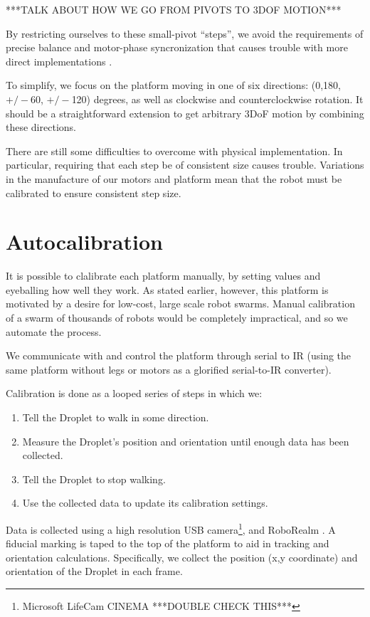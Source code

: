 \documentclass[letterpaper, 10pt, conference]{ieeeconf}
\begin{document}
***TALK ABOUT HOW WE GO FROM PIVOTS TO 3DOF MOTION***

By restricting ourselves to these small-pivot ``steps'', we avoid the requirements of precise balance and motor-phase syncronization that causes trouble with more direct implementations \cite{Vartholomeos2006}.

To simplify, we focus on the platform moving in one of six directions: (0,180, $+/-$60, $+/-$120) degrees, as well as clockwise and counterclockwise rotation. It should be a straightforward extension to get arbitrary 3DoF motion by combining these directions.

 There are still some difficulties to overcome with physical implementation. In particular, requiring that each step be of consistent size causes trouble. Variations in the manufacture of our motors and platform mean that the robot must be calibrated to ensure consistent step size.

\section{Autocalibration}

It is possible to clalibrate each platform manually, by setting values and eyeballing how well they work. As stated earlier, however, this platform is motivated by a desire for low-cost, large scale robot swarms.  Manual calibration of a swarm of thousands of robots would be completely impractical, and so we automate the process.

We communicate with and control the platform through serial to IR (using the same platform without legs or motors as a glorified serial-to-IR converter). 

Calibration is done as a looped series of steps in which we:
\begin{enumerate}
\item Tell the Droplet to walk in some direction.
\item Measure the Droplet's position and orientation until enough data has been collected.
\item Tell the Droplet to stop walking.
\item Use the collected data to update its calibration settings.
\end{enumerate}
Data is collected using a high resolution USB camera\footnote{Microsoft LifeCam CINEMA ***DOUBLE CHECK THIS***}, and RoboRealm \cite{RoboRealm}. A fiducial marking is taped to the top of the platform to aid in tracking and orientation calculations. Specifically, we collect the position (x,y coordinate) and orientation of the Droplet in each frame.
\end{document}
